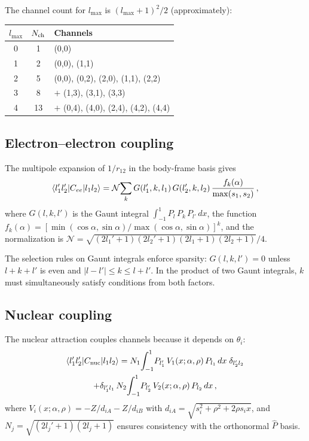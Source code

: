 \documentclass[aps,pra,twocolumn,superscriptaddress,longbibliography]{revtex4-2}
\begin{document}
The channel count for $l_{\max}$ is $(l_{\max}+1)^2/2$ (approximately):

\begin{center}
\begin{tabular}{ccl}
\toprule
$l_{\max}$ & $N_{\rm ch}$ & Channels \\
\midrule
0 & 1 & (0,0) \\
1 & 2 & (0,0), (1,1) \\
2 & 5 & (0,0), (0,2), (2,0), (1,1), (2,2) \\
3 & 8 & $+$ (1,3), (3,1), (3,3) \\
4 & 13 & $+$ (0,4), (4,0), (2,4), (4,2), (4,4) \\
\bottomrule
\end{tabular}
\end{center}

\subsection{Electron--electron coupling}

The multipole expansion of $1/r_{12}$ in the body-frame basis gives
\begin{equation}
  \braket{l_1' l_2' | C_{ee} | l_1 l_2}
  = \mathcal{N}\!\sum_k
    G(l_1',k,l_1)\,G(l_2',k,l_2)\,\frac{f_k(\alpha)}{\max(s_1,s_2)}\,,
  \label{eq:Wee}
\end{equation}
where $G(l,k,l')$ is the Gaunt integral
$\int_{-1}^1 P_l\,P_k\,P_{l'}\,dx$, the function
$f_k(\alpha) = [\min(\cos\alpha,\sin\alpha)/\max(\cos\alpha,\sin\alpha)]^k$,
and the normalization is
$\mathcal{N} = \sqrt{(2l_1'+1)(2l_2'+1)(2l_1+1)(2l_2+1)}/4$.

The selection rules on Gaunt integrals enforce sparsity:
$G(l,k,l') = 0$ unless $l+k+l'$ is even and $|l-l'| \le k \le l+l'$.
In the product of two Gaunt integrals, $k$ must simultaneously
satisfy conditions from both factors.

\subsection{Nuclear coupling}

The nuclear attraction couples channels because it depends on
$\theta_i$:
\begin{multline}
  \braket{l_1' l_2' | C_{\rm nuc} | l_1 l_2}
  = N_1\!\int_{-1}^1\! P_{l_1'}\,V_1(x;\alpha,\rho)\,P_{l_1}\,dx\;\delta_{l_2' l_2}
  \\
  + \delta_{l_1' l_1}\,N_2\!\int_{-1}^1\! P_{l_2'}\,V_2(x;\alpha,\rho)\,P_{l_2}\,dx\,,
  \label{eq:Wnuc}
\end{multline}
where $V_i(x;\alpha,\rho) = -Z/d_{iA} - Z/d_{iB}$ with
$d_{iA} = \sqrt{s_i^2 + \rho^2 + 2\rho s_i x}$, and
$N_j = \sqrt{(2l_j'+1)(2l_j+1)}$ ensures consistency with the
orthonormal $\hat P$ basis.
\end{document}
